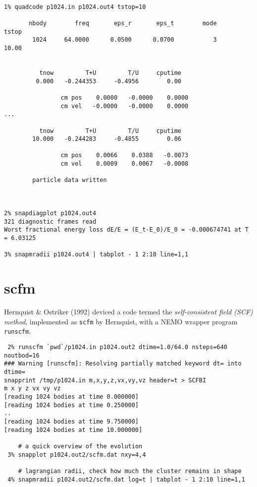 \footnotesize\begin{verbatim}

1% quadcode p1024.in p1024.out4 tstop=10

       nbody        freq       eps_r       eps_t        mode       tstop
        1024     64.0000      0.0500      0.0700           3       10.00
 
 
          tnow         T+U         T/U     cputime
         0.000   -0.244353     -0.4956        0.00
 
                cm pos    0.0000   -0.0000    0.0000
                cm vel   -0.0000   -0.0000    0.0000
...

          tnow         T+U         T/U     cputime
        10.000   -0.244283     -0.4855        0.06
 
                cm pos    0.0066    0.0388   -0.0073
                cm vel    0.0009    0.0067   -0.0008
 
        particle data written



2% snapdiagplot p1024.out4
321 diagnostic frames read
Worst fractional energy loss dE/E = (E_t-E_0)/E_0 = -0.000674741 at T = 6.03125

3% snapmradii p1024.out4 | tabplot - 1 2:10 line=1,1

\end{verbatim}\normalsize


\section{scfm}

Hernquist \& Ostriker (1992) deviced a code termed the 
{\it self-consistent field (SCF) method}, implemented as {\tt scfm} by
Hernquist, with a NEMO wrapper program {\tt runscfm}.

\footnotesize\begin{verbatim}
 2% runscfm `pwd`/p1024.in p1024.out2 dtime=1.0/64.0 nsteps=640 noutbod=16
### Warning [runscfm]: Resolving partially matched keyword dt= into dtime=
snapprint /tmp/p1024.in m,x,y,z,vx,vy,vz header=t > SCFBI
m x y z vx vy vz
[reading 1024 bodies at time 0.000000]
[reading 1024 bodies at time 0.250000]
..
[reading 1024 bodies at time 9.750000]
[reading 1024 bodies at time 10.000000]

    # a quick overview of the evolution 
 3% snapplot p1024.out2/scfm.dat nxy=4,4

    # lagrangian radii, check how much the cluster remains in shape
 4% snapmradii p1024.out2/scfm.dat log=t | tabplot - 1 2:10 line=1,1
 

\end{verbatim}\normalsize


